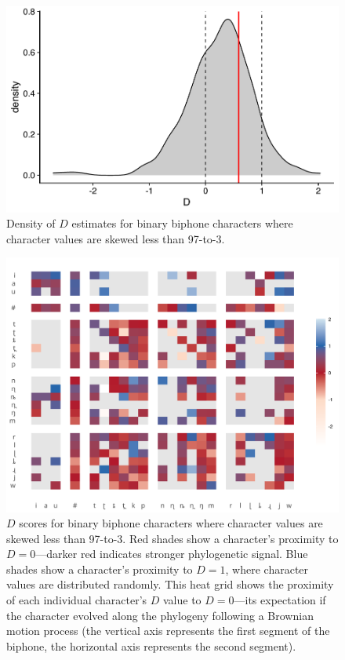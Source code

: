 \begin{figure}

{\centering \includegraphics[width=0.66\linewidth]{05-phylo-signal/fig/d-density-filtered} 

}

\caption{Density of $D$ estimates for binary biphone characters where character values are skewed less than 97-to-3.}\label{fig:d-density-filtered}
\end{figure}

\begin{figure}

{\centering \includegraphics[width=0.75\linewidth]{05-phylo-signal/fig/d-swatch-filtered} 

}

\caption{$D$ scores for binary biphone characters where character values are skewed less than 97-to-3. Red shades show a character's proximity to $D=0$---darker red indicates stronger phylogenetic signal. Blue shades show a character's proximity to $D=1$, where character values are distributed randomly. This heat grid shows the proximity of each individual character's $D$ value to $D=0$---its expectation if the character evolved along the phylogeny following a Brownian motion process (the vertical axis represents the first segment of the biphone, the horizontal axis represents the second segment).}\label{fig:d-swatch-filtered}
\end{figure}

